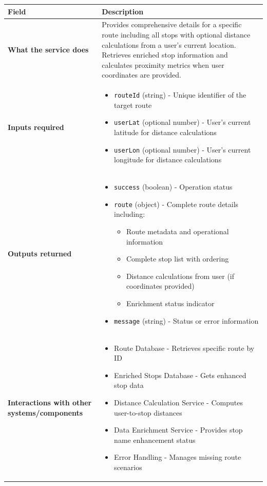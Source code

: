 \documentclass[11pt,a4paper]{article}
\begin{document}
\begin{longtable}{|p{4cm}|p{12cm}|}
\hline
\textbf{Field} & \textbf{Description} \\
\hline
\textbf{What the service does} & 
Provides comprehensive details for a specific route including all stops with optional distance calculations from a user's current location. Retrieves enriched stop information and calculates proximity metrics when user coordinates are provided. \\
\hline
\textbf{Inputs required} & 
\begin{itemize}[nosep]
\item \texttt{routeId} (string) - Unique identifier of the target route
\item \texttt{userLat} (optional number) - User's current latitude for distance calculations
\item \texttt{userLon} (optional number) - User's current longitude for distance calculations
\end{itemize} \\
\hline
\textbf{Outputs returned} & 
\begin{itemize}[nosep]
\item \texttt{success} (boolean) - Operation status
\item \texttt{route} (object) - Complete route details including:
  \begin{itemize}[nosep]
  \item Route metadata and operational information
  \item Complete stop list with ordering
  \item Distance calculations from user (if coordinates provided)
  \item Enrichment status indicator
  \end{itemize}
\item \texttt{message} (string) - Status or error information
\end{itemize} \\
\hline
\textbf{Interactions with other systems/components} & 
\begin{itemize}[nosep]
\item Route Database - Retrieves specific route by ID
\item Enriched Stops Database - Gets enhanced stop data
\item Distance Calculation Service - Computes user-to-stop distances
\item Data Enrichment Service - Provides stop name enhancement status
\item Error Handling - Manages missing route scenarios
\end{itemize} \\
\hline
\end{longtable}
\end{document}
